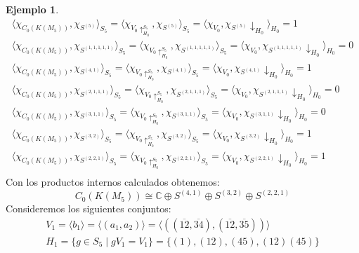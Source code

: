 \documentclass[12pt]{book}
\theoremstyle{definition}
\newtheorem{example}[theorem]{Ejemplo}
\newcounter{in}
\begin{document}
\begin{example}
\begin{eqnarray*}
  \langle\chi_{C_{0}(K(M_{5}))},\chi_{S^{(5)}}\rangle_{S_{5}}=\langle\chi_{V_{0}\uparrow^{S_{5}}_{H_0}},\chi_{S^{(5)}}\rangle_{S_{5}}=\langle\chi_{V_{0}},\chi_{S^{(5)}}\downarrow_{H_{0}}\rangle_{H_{0}}=1\\
 \langle\chi_{C_{0}(K(M_{5}))},\chi_{S^{(1,1,1,1,1)}}\rangle_{S_{5}}=\langle\chi_{V_{0}\uparrow^{S_{5}}_{H_0}},\chi_{S^{(1,1,1,1,1)}}\rangle_{S_{5}}=\langle\chi_{V_{0}},\chi_{S^{(1,1,1,1,1)}}\downarrow_{H_{0}}\rangle_{H_{0}}=0\\
\langle\chi_{C_{0}(K(M_{5}))},\chi_{S^{(4,1)}}\rangle_{S_{5}}=\langle\chi_{V_{0}\uparrow^{S_{5}}_{H_0}},\chi_{S^{(4,1)}}\rangle_{S_{5}}=\langle\chi_{V_{0}},\chi_{S^{(4,1)}}\downarrow_{H_{0}}\rangle_{H_{0}}=1\\
\langle\chi_{C_{0}(K(M_{5}))},\chi_{S^{(2,1,1,1)}}\rangle_{S_{5}}=\langle\chi_{V_{0}\uparrow^{S_{5}}_{H_0}},\chi_{S^{(2,1,1,1)}}\rangle_{S_{5}}=\langle\chi_{V_{0}},\chi_{S^{(2,1,1,1)}}\downarrow_{H_{0}}\rangle_{H_{0}}=0\\
\langle\chi_{C_{0}(K(M_{5}))},\chi_{S^{(3,1,1)}}\rangle_{S_{5}}=\langle\chi_{V_{0}\uparrow^{S_{5}}_{H_0}},\chi_{S^{(3,1,1)}}\rangle_{S_{5}}=\langle\chi_{V_{0}},\chi_{S^{(3,1,1)}}\downarrow_{H_{0}}\rangle_{H_{0}}=0\\
\langle\chi_{C_{0}(K(M_{5}))},\chi_{S^{(3,2)}}\rangle_{S_{5}}=\langle\chi_{V_{0}\uparrow^{S_{5}}_{H_0}},\chi_{S^{(3,2)}}\rangle_{S_{5}}=\langle\chi_{V_{0}},\chi_{S^{(3,2)}}\downarrow_{H_{0}}\rangle_{H_{0}}=1\\
\langle\chi_{C_{0}(K(M_{5}))},\chi_{S^{(2,2,1)}}\rangle_{S_{5}}=\langle\chi_{V_{0}\uparrow^{S_{5}}_{H_0}},\chi_{S^{(2,2,1)}}\rangle_{S_{5}}=\langle\chi_{V_{0}},\chi_{S^{(2,2,1)}}\downarrow_{H_{0}}\rangle_{H_{0}}=1\\
\end{eqnarray*}
Con los productos internos calculados obtenemos:
\begin{equation}
C_{0}(K(M_{5}))\cong \mathbb{C}\oplus S^{(4,1)}\oplus S^{(3,2)}\oplus
S^{(2,2,1)}
\label{C0-KM5}
\end{equation}
Consideremos los siguientes conjuntos:
\begin{eqnarray*}
V_{1}=\langle b_{1}\rangle=\langle (a_{1},a_{2})\rangle=\langle((\overline{12},\overline{34}),(\overline{12},\overline{35}))\rangle\\
H_{1}=\{g\in S_{5}\mid gV_{1}=V_{1}\}=\{(1),(12),(45),(12)(45)\}
\end{eqnarray*}

\end{example}
\end{document}
